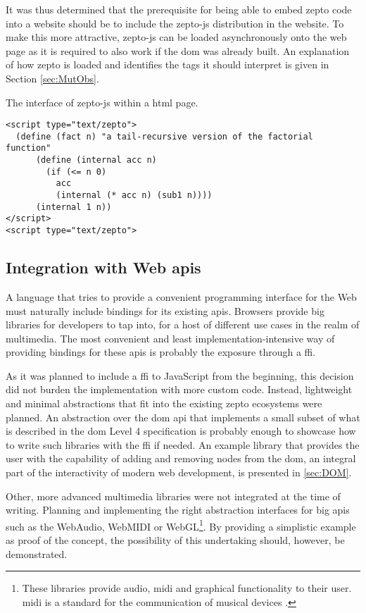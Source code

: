 \documentclass[oneside,11pt,xetex]{scrbook}
\begin{document}
It was thus determined that the prerequisite for being able to embed zepto code into
a website should be to include the zepto-js distribution in the website. To make
this more attractive, zepto-js can be loaded asynchronously onto the web page as it
is required to also work if the \gls{dom} was already built. An explanation of how
zepto is loaded and identifies the tags it should interpret is given in Section \ref{sec:MutObs}.

\begin{listing}[H]
\caption{The interface of zepto-js within a \gls{html} page.}
\begin{verbatim}
<script type="text/zepto">
  (define (fact n) "a tail-recursive version of the factorial function"
      (define (internal acc n)
        (if (<= n 0)
          acc
          (internal (* acc n) (sub1 n))))
      (internal 1 n))
</script>
<script type="text/zepto">
\end{verbatim}
\label{fig:zpjs}
\end{listing}

\subsection{Integration with Web \glspl{api}}

A language that tries to provide a convenient programming interface for the Web must
naturally include bindings for its existing \glspl{api}. Browsers provide big libraries
for developers to tap into, for a host of different use cases in the realm of multimedia.
The most convenient and least implementation-intensive way of providing bindings for
these \glspl{api} is probably the exposure through a \gls{ffi}.

As it was planned to include a \gls{ffi} to JavaScript from the beginning, this decision
did not burden the implementation with more custom code. Instead, lightweight and minimal
abstractions that fit into the existing zepto ecosystems were planned. An abstraction
over the \gls{dom} \gls{api} that implements a small subset of what is described in
the \gls{dom} Level 4 specification \parencite{DOM4} is probably enough to showcase how to
write such libraries with the \gls{ffi} if needed. An example library that provides the
user with the capability of adding and removing nodes from the \gls{dom}, an integral
part of the interactivity of modern web development, is presented in \ref{sec:DOM}.

Other, more advanced multimedia libraries were not integrated at the time of writing.
Planning and implementing the right abstraction interfaces for big \glspl{api} such as
the WebAudio, WebMIDI or WebGL\footnote{These libraries provide audio, \gls{midi} and
graphical functionality to their user. \gls{midi} is a standard for the communication
of musical devices \parencite{MIDI}.}. By providing a simplistic example as proof
of the concept, the possibility of this undertaking should, however, be demonstrated.
\end{document}
